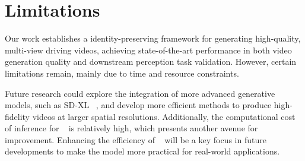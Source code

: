 \section{Limitations}

Our work establishes a identity-preserving framework for generating high-quality, multi-view driving videos, achieving state-of-the-art performance in both video generation quality and downstream perception task validation. 
However, certain limitations remain, mainly due to time and resource constraints.  



Future research could explore the integration of more advanced generative models, such as SD-XL ~\cite{DBLP:journals/corr/abs-2307-01952}, and develop more efficient methods to produce high-fidelity videos at larger spatial resolutions. 
Additionally, the computational cost of inference for \titleDef~ is relatively high, which presents another avenue for improvement. Enhancing the efficiency of \titleDef~ will be a key focus in future developments to make the model more practical for real-world applications.  
